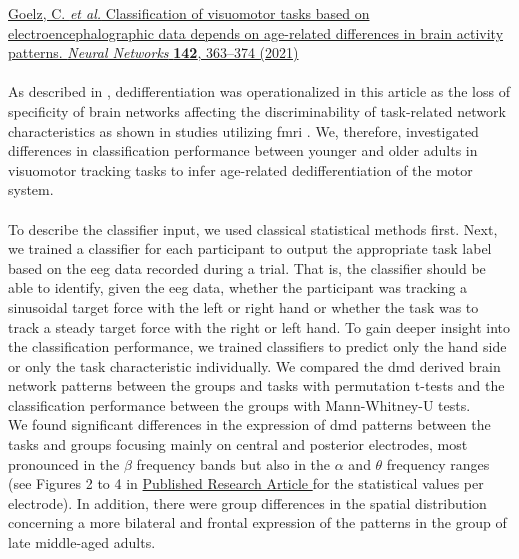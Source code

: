 \hyperref[pub:paperI]{Goelz, C. \textit{et al.} Classification of visuomotor tasks based on electroencephalographic data depends on age-related differences in brain activity patterns. \textit{Neural Networks} \textbf{142}, 363--374 (2021)}\\
\\
As described in , dedifferentiation was operationalized in this article as the loss of specificity of brain networks affecting the discriminability of task-related network characteristics as shown in studies utilizing \gls{fmri} \cite{Koen2019,Carb2011}. We, therefore, investigated differences in classification performance between younger and older adults in visuomotor tracking tasks to infer age-related dedifferentiation of the motor system.\\
\\
To describe the classifier input, we used classical statistical methods first. Next, we trained a classifier for each participant to output the appropriate task label based on the \gls{eeg} data recorded during a trial. That is, the classifier should be able to identify, given the \gls{eeg} data, whether the participant was tracking a sinusoidal target force with the left or right hand or whether the task was to track a steady target force with the right or left hand. To gain deeper insight into the classification performance, we trained classifiers to predict only the hand side or only the task characteristic individually. We compared the \gls{dmd} derived brain network patterns between the groups and tasks with permutation t-tests and the classification performance between the groups with Mann-Whitney-U tests.\\
\newpage
\noindent We found significant differences in the expression of \gls{dmd} patterns between the tasks and groups focusing mainly on central and posterior electrodes, most pronounced in the $\beta$ frequency bands but also in the $\alpha$ and $\theta$ frequency ranges (see Figures 2 to 4 in \hyperref[pub:paperI]{Published Research Article } for the statistical values per electrode). In addition, there were group differences in the spatial distribution concerning a more bilateral and frontal expression of the patterns in the group of late middle-aged adults.\\

